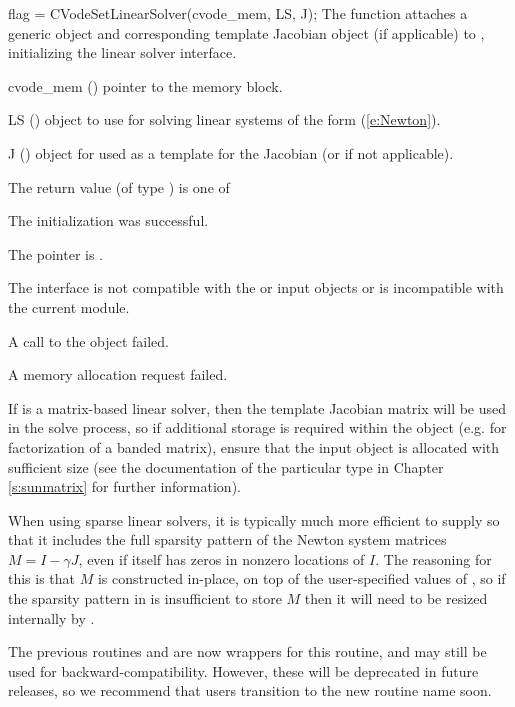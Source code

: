 {
  flag = CVodeSetLinearSolver(cvode\_mem, LS, J);
}
{
  The function  attaches a generic {\sunlinsol}
  object  and corresponding template Jacobian {\sunmatrix}
  object  (if applicable) to {\cvode}, initializing the
  {\cvls} linear solver interface.
}
{
  \begin{args}
  \item[cvode\_mem] ()
    pointer to the {\cvode} memory block.
  \item[LS] ()
    {\sunlinsol} object to use for solving linear systems of the form
    (\ref{e:Newton}).
  \item[J] ()
    {\sunmatrix} object for used as a template for the Jacobian (or
     if not applicable).
  \end{args}
}
{
  The return value  (of type ) is one of
  \begin{args}
  \item[\Id{CVLS\_SUCCESS}]
    The {\cvls} initialization was successful.
  \item[\Id{CVLS\_MEM\_NULL}]
    The  pointer is .
  \item[\Id{CVLS\_ILL\_INPUT}]
    The {\cvls} interface is not compatible with the  or
     input objects or is incompatible with the current
    {\nvector} module.
  \item[\Id{CVLS\_SUNLS\_FAIL}]
    A call to the  object failed.
  \item[\Id{CVLS\_MEM\_FAIL}]
    A memory allocation request failed.
  \end{args}
}
{
  If  is a matrix-based linear solver, then the template
  Jacobian matrix  will be used in the solve process, so if
  additional storage is required within the {\sunmatrix} object
  (e.g. for factorization of a banded matrix), ensure that the input
  object is allocated with sufficient size (see the documentation of
  the particular {\sunmatrix} type in Chapter \ref{s:sunmatrix} for
  further information).

  When using sparse linear solvers, it is typically much more
  efficient to supply  so that it includes the full sparsity
  pattern of the Newton system matrices $M=I-\gamma J$, even if 
  itself has zeros in nonzero locations of $I$.  The reasoning for
  this is that $M$ is constructed in-place, on top of the
  user-specified values of , so if the sparsity pattern in
   is insufficient to store $M$ then it will need to be resized
  internally by {\cvode}.

  The previous routines  and
   are now wrappers for this routine, and may
  still be used for backward-compatibility.  However, these will be
  deprecated in future releases, so we recommend that users transition
  to the new routine name soon.
}

